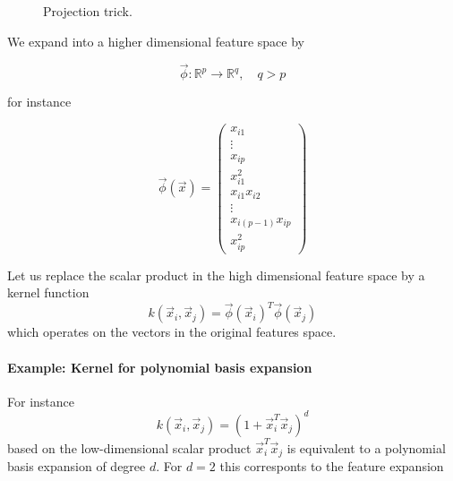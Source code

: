 \begin{figure}[!htb]
    \centering
    
    \caption{Projection trick.}
    \label{fig:projection_trick}
\end{figure}


We expand into a higher dimensional feature space by

\begin{equation}
    \vec{\phi} : \mathbb{R}^p \rightarrow \mathbb{R}^q, \quad q > p
\end{equation}

for instance

\begin{equation}
    \vec{\phi}(\vec{x}) = \begin{pmatrix}
    x_{i1} \\ \vdots \\ x_{ip} \\ x_{i1}^2 \\ x_{i1}x_{i2} \\ \vdots \\ x_{i(p-1)}x_{ip} \\ x_{ip}^2
    \end{pmatrix}
\end{equation}

Let us replace the scalar product in the high dimensional feature space by a kernel function
\begin{equation}
    k(\vec{x}_i, \vec{x}_j) = \vec{\phi}(\vec{x}_i)^T \vec{\phi}(\vec{x}_j)
\end{equation}
which operates on the vectors in the original features space.

\paragraph*{Example: Kernel for polynomial basis expansion}
For instance
\begin{equation}
    k(\vec{x}_i, \vec{x}_j) = (1 + \vec{x}_i^T \vec{x}_j)^d
\end{equation}
based on the low-dimensional scalar product $\vec{x}_i^T \vec{x}_j$ is equivalent to a 
polynomial basis expansion of degree $d$. For $d = 2$ this corresponts to the
feature expansion

